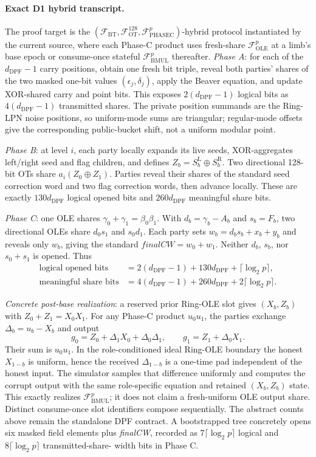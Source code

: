 \documentclass[11pt]{article}
\newcommand{\dpfd}{d_{\mathrm{DPF}}} %
\begin{document}
\paragraph{Exact D1 hybrid transcript.}
The proof target is the
$(\mathcal F_{\mathrm{BT}},\mathcal F_{\mathrm{OT}}^{128},
\mathcal F_{\mathrm{PHASEC}}^p)$-hybrid protocol instantiated by the current
source, where each Phase-C product uses fresh-share
$\mathcal F_{\mathrm{OLE}}^p$ at a limb's base epoch or consume-once stateful
$\mathcal F_{\mathrm{BMUL}}^p$ thereafter. \emph{Phase A}: for each of the
$\dpfd-1$ carry positions, obtain one fresh bit triple, reveal both parties'
shares of the two masked one-bit
values $(\epsilon_j,\delta_j)$, apply the Beaver equation, and update
XOR-shared carry and point bits. This exposes $2(\dpfd-1)$ logical bits as
$4(\dpfd-1)$ transmitted shares. The private position summands are the
Ring-LPN noise positions, so uniform-mode sums are triangular; regular-mode
offsets give the corresponding public-bucket shift, not a uniform modular
point.

\emph{Phase B}: at level $i$, each party locally expands its live seeds,
XOR-aggregates left/right seed and flag children, and defines
$Z_b=S_b^{\mathrm L}\oplus S_b^{\mathrm R}$. Two directional 128-bit OTs
share $a_i(Z_0\oplus Z_1)$. Parties reveal their shares of the standard
seed correction word and two flag correction words, then advance locally.
These are exactly $130\dpfd$ logical opened bits and $260\dpfd$ meaningful
share bits.

\emph{Phase C}: one OLE shares
$\gamma_0+\gamma_1=\beta_0\beta_1$. With
$d_b=\gamma_b-A_b$ and $s_b=F_b$, two directional OLEs share
$d_0s_1$ and $s_0d_1$. Each party sets
$w_b=d_bs_b+x_b+y_b$ and reveals only $w_b$, giving the standard
$\mathit{finalCW}=w_0+w_1$. Neither $d_b$, $s_b$, nor
$s_0+s_1$ is opened. Thus
\[
\begin{aligned}
\text{logical opened bits}&=2(\dpfd-1)+130\dpfd+\lceil\log_2 p\rceil,\\
\text{meaningful share bits}&=4(\dpfd-1)+260\dpfd+
 2\lceil\log_2 p\rceil .
\end{aligned}
\]

\emph{Concrete post-base realization}: a reserved prior Ring-OLE slot gives
$(X_b,Z_b)$ with $Z_0+Z_1=X_0X_1$. For any Phase-C product
$u_0u_1$, the parties exchange $\Delta_b=u_b-X_b$ and output
\[
g_0=Z_0+\Delta_1X_0+\Delta_0\Delta_1,\qquad
g_1=Z_1+\Delta_0X_1.
\]
Their sum is $u_0u_1$. In the role-conditioned ideal Ring-OLE boundary the
honest $X_{1-b}$ is uniform, hence the received $\Delta_{1-b}$ is a one-time
pad independent of the honest input. The simulator samples that difference
uniformly and computes the corrupt output with the same role-specific equation
and retained $(X_b,Z_b)$ state. This exactly realizes
$\mathcal F_{\mathrm{BMUL}}^p$; it does not claim a fresh-uniform OLE output
share. Distinct consume-once slot identifiers compose sequentially. The
abstract counts
above remain the standalone DPF contract. A bootstrapped tree concretely opens
six masked field elements plus \textit{finalCW}, recorded as
$7\lceil\log_2p\rceil$ logical and $8\lceil\log_2p\rceil$ transmitted-share-
width bits in Phase C.
\end{document}
